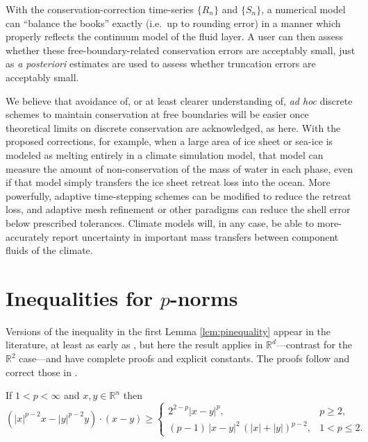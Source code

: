 \documentclass[final,leqno,onefignum,onetabnum]{siamltex1213bueler}
\newcommand\RR{\mathbb{R}}
\begin{document}
With the conservation-correction time-series $\{R_n\}$ and $\{S_n\}$, a numerical model can ``balance the books'' exactly (i.e.~up to rounding error) in a manner which properly reflects the continuum model of the fluid layer.  A user can then assess whether these free-boundary-related conservation errors are acceptably small, just as \emph{a posteriori} estimates are used to assess whether truncation errors are acceptably small.

We believe that avoidance of, or at least clearer understanding of, \emph{ad hoc} discrete schemes to maintain conservation at free boundaries will be easier once theoretical limits on discrete conservation are acknowledged, as here.  With the proposed corrections, for example, when a large area of ice sheet or sea-ice is modeled as melting entirely in a climate simulation model, that model can measure the amount of non-conservation of the mass of water in each phase, even if that model simply transfers the ice sheet retreat loss into the ocean.  More powerfully, adaptive time-stepping schemes can be modified to reduce the retreat loss, and adaptive mesh refinement or other paradigms can reduce the shell error below prescribed tolerances.  Climate models will, in any case, be able to more-accurately report uncertainty in important mass transfers between component fluids of the climate.







\appendix

\section{Inequalities for $p$-norms}   \label{app:pinequalities}  Versions of the inequality in the first Lemma \eqref{lem:pinequality} appear in the literature, at least as early as \cite{GlowinskiMarroco1975}, but here the result applies in $\RR^d$---contrast \cite{BarrettLiu1993,GlowinskiMarroco1975} for the $\RR^2$ case---and have complete proofs and explicit constants.  The proofs follow and correct those in \cite[Appendix A]{Peral1997}.

\begin{lemma}  \label{lem:pinequality}  If $1<p<\infty$ and $x,y\in\RR^n$ then
\begin{equation}
\left(|x|^{p-2} x - |y|^{p-2} y\right)\cdot(x-y) \ge
   \begin{cases}
       2^{2-p} |x-y|^p, & p\ge 2, \\
       (p-1)\, |x-y|^2 \, \left(|x|+|y|\right)^{p-2}, & 1 < p \le 2.
   \end{cases} \label{eq:pinequality}
\end{equation}
\end{lemma}
\end{document}
